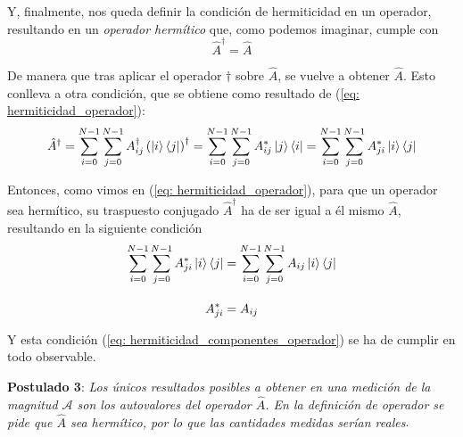 \documentclass[12pt]{article}
\numberwithin{equation}{section} %
\begin{document}
    \vspace{1.5mm}

    Y, finalmente, nos queda definir la condición de hermiticidad en un operador, resultando en un \textit{operador hermítico} que, como podemos imaginar, cumple con
    \begin{equation}
        \hat{A} ^ {\dagger} = \hat{A}
        \label{eq: hermiticidad_operador}
    \end{equation}

    \vspace{1.5mm}

    De manera que tras aplicar el operador \( \dagger \) sobre \( \hat{A} \), se vuelve a obtener \( \hat{A} \). Esto conlleva a otra condición, que se obtiene como resultado de (\ref{eq: hermiticidad_operador}):
    \begin{equation*}
        \hat{A} ^ {\dagger} = \sum_{i = 0}^{N - 1} \sum_{j = 0}^{N - 1} A_{ij}^{\dagger} \left( \ket{i} \bra{j} \right) ^ {\dagger} = \sum_{i = 0}^{N - 1} \sum_{j = 0}^{N - 1} A_{ij}^{*} \ket{j} \bra{i} = \sum_{i = 0}^{N - 1} \sum_{j = 0}^{N - 1} A_{ji}^{*} \ket{i} \bra{j}
    \end{equation*}

    \vspace{1.5mm}

    Entonces, como vimos en (\ref{eq: hermiticidad_operador}), para que un operador sea hermítico, su traspuesto conjugado \( \hat{A}^{\dagger} \) ha de ser igual a él mismo \( \hat{A} \), resultando en la siguiente condición
    \begin{align}
        \sum_{i = 0}^{N - 1} \sum_{j = 0}^{N - 1} A_{ji}^{*} \ket{i} \bra{j} &= \sum_{i = 0}^{N - 1} \sum_{j = 0}^{N - 1} A_{ij} \ket{i} \bra{j} \\[10pt]
        A_{ji}^{*} &= A_{ij} \label{eq: hermiticidad_componentes_operador}
    \end{align}

    \vspace{1.5mm}

    Y esta condición (\ref{eq: hermiticidad_componentes_operador}) se ha de cumplir en todo observable.
    
    \vspace{10mm}

    \textbf{Postulado 3}: \textit{Los únicos resultados posibles a obtener en una medición de la
    magnitud \( \mathcal{A}\) son los autovalores del operador \( \hat{A} \). En la definición de operador se
    pide que \( \hat{A} \) sea hermítico, por lo que las cantidades medidas serían reales}.
    
\end{document}

